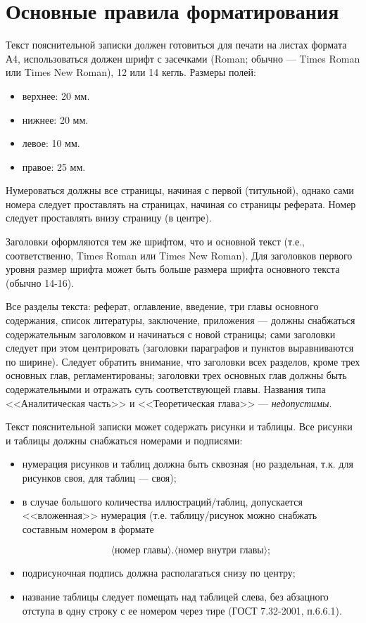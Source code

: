 ﻿\chapter{Основные правила форматирования}\label{app-format}

Текст пояснительной записки должен готовиться для печати на листах формата А4, использоваться должен шрифт с засечками (Roman; обычно --- Times Roman или Times New Roman), 12 или 14 кегль. Размеры полей:

\begin{itemize}
	\item верхнее: 20 мм.
	\item нижнее: 20 мм.
	\item левое: 10 мм.
	\item правое: 25 мм.
\end{itemize}

Нумероваться должны все страницы, начиная с первой (титульной), однако сами номера следует проставлять на страницах, начиная со страницы реферата. Номер следует проставлять внизу страницу (в центре).

Заголовки оформляются тем же шрифтом, что и основной текст (т.е., соответственно, Times Roman или Times New Roman). Для заголовков первого уровня размер шрифта может быть больше размера шрифта основного текста (обычно 14-16).

Все разделы текста: реферат, оглавление, введение, три главы основного
содержания, список литературы, заключение, приложения --- должны снабжаться
содержательным заголовком и начинаться с новой страницы; сами заголовки следует
при этом центрировать (заголовки параграфов и пунктов выравниваются по ширине).
Следует обратить внимание, что заголовки всех разделов, кроме трех основных
глав, регламентированы; заголовки трех основных глав должны быть содержательными
и отражать суть соответствующей главы. Названия типа <<Аналитическая часть>> и <<Теоретическая глава>> --- \textit{недопустимы}.

Текст пояснительной записки может содержать рисунки и таблицы. Все рисунки и
таблицы должны снабжаться номерами и подписями:

\begin{itemize}

	\item нумерация рисунков и таблиц должна быть сквозная (но раздельная, т.к. для рисунков своя, для таблиц --- своя);

	\item в случае большого количества иллюстраций/таблиц, допускается <<вложенная>> нумерация (т.е. таблицу/рисунок можно снабжать составным номером в формате 
	
	$$\langle\mbox{номер главы}\rangle.\langle\mbox{номер внутри главы}\rangle;$$
	
	\item подрисуночная подпись должна располагаться снизу по центру;
	
	\item название таблицы следует помещать над таблицей слева, без абзацного
	отступа в одну строку с ее номером через тире (ГОСТ 7.32-2001, п.6.6.1).

\end{itemize}

